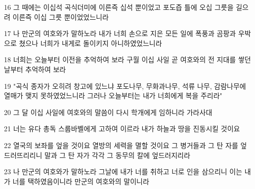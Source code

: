 \par 16 그 때에는 이십석 곡식더미에 이른즉 십석 뿐이었고 포도즙 틀에 오십 그릇을 길으려 이른즉 이십 그릇 뿐이었었느니라
\par 17 나 만군의 여호와가 말하노라 내가 너희 손으로 지은 모든 일에 폭풍과 곰팡과 우박으로 쳤으나 너희가 내게로 돌이키지 아니하였었느니라
\par 18 너희는 오늘부터 이전을 추억하여 보라 구월 이십 사일 곧 여호와의 전 지대를 쌓던 날부터 추억하여 보라
\par 19 "곡식 종자가 오히려 창고에 있느냐 포도나무, 무화과나무, 석류 나무, 감람나무에 열매가 맺지 못하였었느니라 그러나 오늘부터는 내가 너희에게 복을 주리라"
\par 20 그 달 이십 사일에 여호와의 말씀이 다시 학개에게 임하니라 가라사대
\par 21 너는 유다 총독 스룹바벨에게 고하여 이르라 내가 하늘과 땅을 진동시킬 것이요
\par 22 열국의 보좌를 엎을 것이요 열방의 세력을 멸할 것이요 그 병거들과 그 탄 자를 엎드러뜨리리니 말과 그 탄 자가 각각 그 동무의 칼에 엎드러지리라
\par 23 나 만군의 여호와가 말하노라 그날에 내가 너를 취하고 너로 인을 삼으리니 이는 내가 너를 택하였음이니라 만군의 여호와의 말이니라


